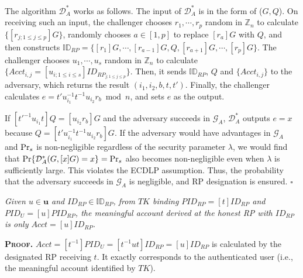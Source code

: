The algorithm $\mathcal{D}^*_A$ works as follows.
The input of $\mathcal{D}^*_A$ is in the form of ($G, Q$). On receiving such an input, the challenger chooses $r_1, \cdots, r_p$ random in $\mathbb{Z}_n$ to calculate $\{[r_{j;1\leq j \leq p}]G\}$,
 randomly chooses $a \in [1,p]$ to replace $[r_{a}]G$ with $Q$,
 and then constructs $\mathbb{ID}_{RP} = \{[r_1]G, \cdots, [r_{a-1}]G, Q, [r_{a+1}]G, \cdots, [r_{p}]G\}$.
The challenger chooses $u_1, \cdots, u_s$ random in $\mathbb{Z}_n$ to calculate $\{Acct_{i,j}= [u_{i;1\leq i \leq s}]ID_{RP_{j;1 \leq j \leq p}}\}$.
Then, it sends $\mathbb{ID}_{RP}$, $Q$ and $\{Acct_{i,j}\}$ to the adversary, which returns the result $(i_1, i_2, b, t, t')$.
 Finally, the challenger calculates $e = t'u_{i_1}^{-1}t^{-1}u_{i_2}r_{b} \bmod n$, and sets $e$ as the output. %

If $[t'^{-1}u_{i_1}t]Q = [u_{i_2}r_{b}]G$ and the adversary succeeds in $\mathcal{G}_A$, $\mathcal{D}^*_A$ outputs $e =x$
 because $Q = [t'u_{i_1}^{-1}t^{-1}u_{i_2}r_{b}]G$.
If the adversary would have advantages in $\mathcal{G}_A$ and ${\rm Pr}_s$ is non-negligible regardless of the security parameter $\lambda$,
    we would find that ${\rm Pr}\{\mathcal{D}^*_A(G, [x]G)=x\}= {\rm Pr}_s$ also becomes non-negligible even when $\lambda$ is sufficiently large.
This violates the ECDLP assumption.
Thus, the probability that the adversary succeeds in $\mathcal{G}_A$ is negligible,
    and RP designation is ensured.
\hfill $\square$


\begin{thm} \emph{Given $u \in \mathbf{u}$ and $ID_{RP} \in \mathbb{ID}_{RP}$,
from $TK$ binding $PID_{RP}=[t]ID_{RP}$ and $PID_U = [u]PID_{RP}$,
 the meaningful account derived at the honest RP with $ID_{RP}$ 
 is only $Acct = [u]ID_{RP}$.}\label{thm-user-id}
\label{thm-u-id}
\end{thm}

\noindent\textbf{\textsc{Proof.}}
$Acct = [t^{-1}]PID_{U} =[t^{-1}ut]ID_{RP} = [u]ID_{RP}$
    is calculated by the designated RP receiving $t$.
It exactly corresponds to the authenticated user (i.e., the meaningful account identified by $TK$).


